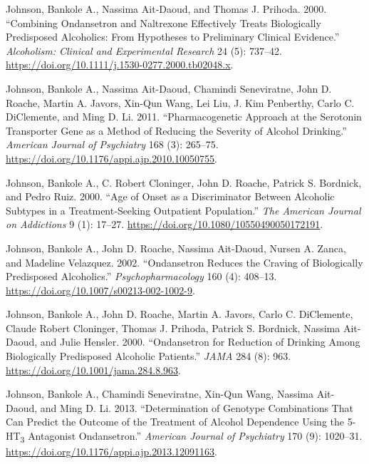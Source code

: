 \documentclass[
  12pt,
]{article}
\newlength{\cslhangindent}
\newenvironment{CSLReferences}[2] %
 {\begin{list}{}{%
  \setlength{\itemindent}{0pt}
  \setlength{\leftmargin}{0pt}
  \setlength{\parsep}{0pt}
  \ifodd #1
   \setlength{\leftmargin}{\cslhangindent}
   \setlength{\itemindent}{-1\cslhangindent}
  \fi
  \setlength{\itemsep}{#2\baselineskip}}}
 {\end{list}}
\begin{document}
\begin{CSLReferences}{1}{0}
Johnson, Bankole A., Nassima Ait‐Daoud, and Thomas J. Prihoda. 2000.
{``Combining {Ondansetron} and {Naltrexone Effectively Treats
Biologically Predisposed Alcoholics}: {From Hypotheses} to {Preliminary
Clinical Evidence}.''} \emph{Alcoholism: Clinical and Experimental
Research} 24 (5): 737--42.
\url{https://doi.org/10.1111/j.1530-0277.2000.tb02048.x}.

Johnson, Bankole A., Nassima Ait-Daoud, Chamindi Seneviratne, John D.
Roache, Martin A. Javors, Xin-Qun Wang, Lei Liu, J. Kim Penberthy, Carlo
C. DiClemente, and Ming D. Li. 2011. {``Pharmacogenetic {Approach} at
the {Serotonin Transporter Gene} as a {Method} of {Reducing} the
{Severity} of {Alcohol Drinking}.''} \emph{American Journal of
Psychiatry} 168 (3): 265--75.
\url{https://doi.org/10.1176/appi.ajp.2010.10050755}.

Johnson, Bankole A., C. Robert Cloninger, John D. Roache, Patrick S.
Bordnick, and Pedro Ruiz. 2000. {``Age of {Onset} as a {Discriminator
Between Alcoholic Subtypes} in a {Treatment}‐{Seeking Outpatient
Population}.''} \emph{The American Journal on Addictions} 9 (1): 17--27.
\url{https://doi.org/10.1080/10550490050172191}.

Johnson, Bankole A., John D. Roache, Nassima Ait-Daoud, Nursen A. Zanca,
and Madeline Velazquez. 2002. {``Ondansetron Reduces the Craving of
Biologically Predisposed Alcoholics.''} \emph{Psychopharmacology} 160
(4): 408--13. \url{https://doi.org/10.1007/s00213-002-1002-9}.

Johnson, Bankole A., John D. Roache, Martin A. Javors, Carlo C.
DiClemente, Claude Robert Cloninger, Thomas J. Prihoda, Patrick S.
Bordnick, Nassima Ait-Daoud, and Julie Hensler. 2000. {``Ondansetron for
{Reduction} of {Drinking Among Biologically Predisposed Alcoholic
Patients}.''} \emph{JAMA} 284 (8): 963.
\url{https://doi.org/10.1001/jama.284.8.963}.

Johnson, Bankole A., Chamindi Seneviratne, Xin-Qun Wang, Nassima
Ait-Daoud, and Ming D. Li. 2013. {``Determination of {Genotype
Combinations That Can Predict} the {Outcome} of the {Treatment} of
{Alcohol Dependence Using} the 5-{HT}{\textsubscript{3}} {Antagonist
Ondansetron}.''} \emph{American Journal of Psychiatry} 170 (9):
1020--31. \url{https://doi.org/10.1176/appi.ajp.2013.12091163}.


\end{CSLReferences}
\end{document}
